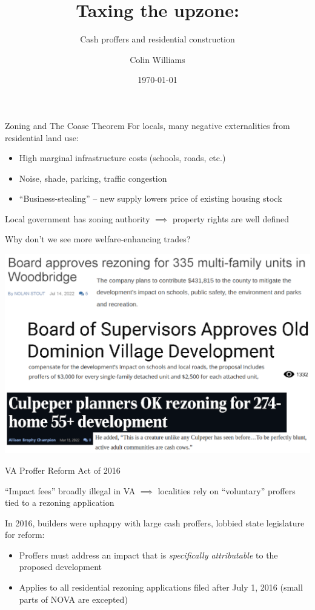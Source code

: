 \documentclass[10pt]{beamer}
\title{Taxing the upzone:}
\subtitle{Cash proffers and residential construction}
\date{\today}
\author{Colin Williams}
\institute{University of Virginia}
\begin{document}
\maketitle

\begin{frame}{Zoning and The Coase Theorem}
    For locals, many negative externalities from residential land use:
    \begin{itemize}
        \item High marginal infrastructure costs (schools, roads, etc.)
        \item Noise, shade, parking, traffic congestion
        \item ``Business-stealing'' -- new supply lowers price of existing housing stock
    \end{itemize}
    \vspace{2em}
    Local government has zoning authority $\implies$ property rights are well defined

    \vspace{2em}
    Why don't we see more welfare-enhancing trades?
\end{frame}


\begin{frame}
    \includegraphics[width=\textwidth]{figures/images/20230312 Rezoning News VA.png}
\end{frame}

\begin{frame}{VA Proffer Reform Act of 2016}

``Impact fees'' broadly illegal in VA $\implies$ localities rely on ``voluntary'' proffers tied to a rezoning application
\vspace{2em}

In 2016, builders were uphappy with large cash proffers, lobbied state legislature for reform:
\begin{itemize}
    \item Proffers must address an impact that is \textit{specifically attributable} to the proposed development
    \item Applies to all residential rezoning applications filed after July 1, 2016 (small parts of NOVA are excepted)
\end{itemize}
\end{frame}
\end{document}
